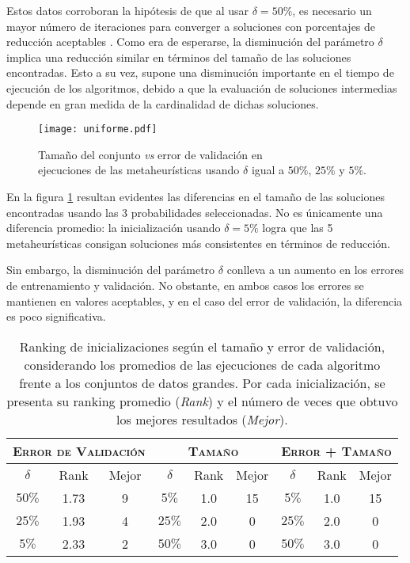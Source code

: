 Estos datos corroboran la hipótesis de que al usar $\delta = 50\%$, es necesario un mayor número de iteraciones para converger a soluciones con porcentajes de reducción aceptables \cite{cano2003using}. Como era de esperarse, la disminución del parámetro $\delta$ implica una reducción similar en términos del tamaño de las soluciones encontradas. Esto a su vez, supone una disminución importante en el tiempo de ejecución de los algoritmos, debido a que la evaluación de soluciones intermedias depende en gran medida de la cardinalidad de dichas soluciones.

\begin{figure}[h!]
\centering
\texttt{[image: uniforme.pdf]}
\caption[Tamaño \emph{vs} error de validación modificando $\delta$]{Tamaño del conjunto \emph{vs} error de validación en\\ejecuciones de las metaheurísticas usando $\delta$ igual a $50\%$, $25\%$ y $5\%$.}
\label{fig-unif}
\end{figure}

En la figura \ref{fig-unif} resultan evidentes las diferencias en el tamaño de las soluciones encontradas usando las 3 probabilidades seleccionadas. No es únicamente una diferencia promedio: la inicialización usando $\delta = 5\%$ logra que las 5 metaheurísticas consigan soluciones más consistentes en términos de reducción.

Sin embargo, la disminución del parámetro $\delta$ conlleva a un aumento en los errores de entrenamiento y validación. No obstante, en ambos casos los errores se mantienen en valores aceptables, y en el caso del error de validación, la diferencia es poco significativa.

\begin{table}[h!]
\centering
\begin{tabular}{c c c|c c c|c c c}
\hline
\multicolumn{3}{c|}{\textsc{Error de Validación}}
	& \multicolumn{3}{c|}{\textsc{Tamaño}}
	& \multicolumn{3}{c}{\textsc{Error + Tamaño}} \\
\hline
$\delta$ & Rank & Mejor & $\delta$ & Rank & Mejor & $\delta$ & Rank & Mejor \\
\hline
\hline
$50\%$ & 1.73 & 9 & $5\%$  & 1.0 & 15 & $5\%$  & 1.0 & 15 \\
$25\%$ & 1.93 & 4 & $25\%$ & 2.0 &  0 & $25\%$ & 2.0 &  0 \\
$5\%$  & 2.33 & 2 & $50\%$ & 3.0 &  0 & $50\%$ & 3.0 &  0 \\
\hline
\end{tabular}
\caption[Ranking de probabilidad de bit $\delta$ según el tamaño y error de validación]{Ranking de inicializaciones según el tamaño y error de validación, considerando los promedios de las ejecuciones de cada algoritmo frente a los conjuntos de datos grandes. Por cada inicialización, se presenta su ranking promedio (\emph{Rank}) y el número de veces que obtuvo los mejores resultados (\emph{Mejor}).}
\label{table-unif-rank}
\end{table}

